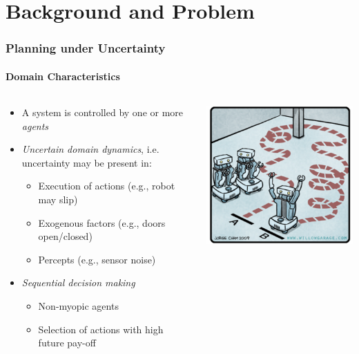 \section{Background and Problem}

\begin{frame}
	\frametitle{Planning under Uncertainty}
	\framesubtitle{Domain Characteristics}
	
	\begin{columns}[T]
		\begin{column}{.7\textwidth}
			\begin{itemize}
				\item A system is controlled by one or more \textit{agents}
				\item \textit{Uncertain domain dynamics}, i.e. uncertainty may be present in:
				\begin{itemize}
					\item Execution of actions (e.g., robot may slip)
					\item Exogenous factors (e.g., doors open/closed)
					\item Percepts (e.g., sensor noise)
				\end{itemize}
				\item \textit{Sequential decision making}
				\begin{itemize}
					\item Non-myopic agents
					\item Selection of actions with high future pay-off
				\end{itemize}
			\end{itemize}
		\end{column}
		\begin{column}{.35\textwidth}
			\includegraphics[width=1.0\textwidth, right]{figures/path-planning2}
		\end{column}
	\end{columns}
\end{frame}

